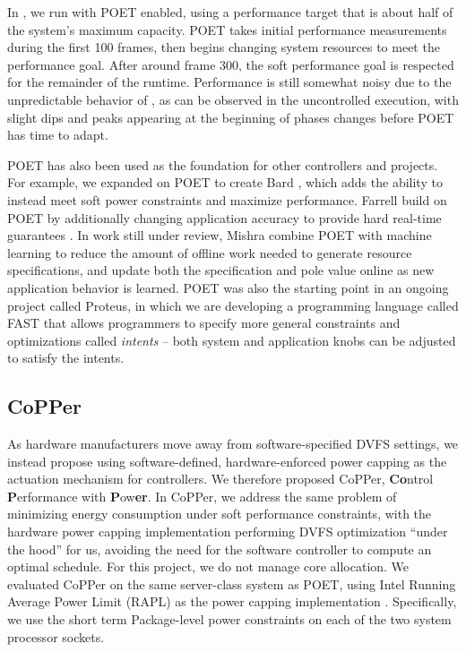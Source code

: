In , we run with POET enabled, using a performance target that is about half of the system's maximum capacity.
POET takes initial performance measurements during the first 100 frames, then begins changing system resources to meet the performance goal.
After around frame 300, the soft performance goal is respected for the remainder of the runtime.
Performance is still somewhat noisy due to the unpredictable behavior of , as can be observed in the uncontrolled execution, with slight dips and peaks appearing at the beginning of phases changes before POET has time to adapt.

POET has also been used as the foundation for other controllers and projects.
For example, we expanded on POET to create Bard \cite{Bard}, which adds the ability to instead meet soft power constraints and maximize performance.
Farrell \etal build on POET by additionally changing application accuracy to provide hard real-time guarantees \cite{meantime}.
In work still under review, Mishra \etal combine POET with machine learning to reduce the amount of offline work needed to generate resource specifications, and update both the specification and pole value online as new application behavior is learned.
POET was also the starting point in an ongoing project called Proteus, in which we are developing a programming language called FAST that allows programmers to specify more general constraints and optimizations called \emph{intents} -- both system and application knobs can be adjusted to satisfy the intents.


\subsection{CoPPer}

As hardware manufacturers move away from software-specified DVFS settings, we instead propose using software-defined, hardware-enforced power capping as the actuation mechanism for controllers.
We therefore proposed CoPPer, \textbf{Co}ntrol \textbf{P}erformance with \textbf{P}ow\textbf{er}.
In CoPPer, we address the same problem of minimizing energy consumption under soft performance constraints, with the hardware power capping implementation performing DVFS optimization ``under the hood'' for us, avoiding the need for the software controller to compute an optimal schedule.
For this project, we do not manage core allocation.
We evaluated CoPPer on the same server-class system as POET, using Intel Running Average Power Limit (RAPL) as the power capping implementation \cite{RAPL}.
Specifically, we use the short term Package-level power constraints on each of the two system processor sockets.

